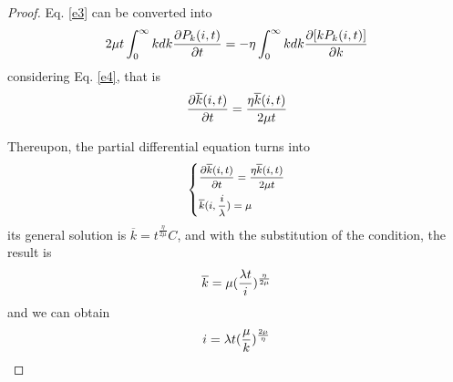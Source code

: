 \documentclass[final]{IEEEtran}
\begin{document}
\begin{proof}
Eq. \ref{e3} can be converted into
\begin{equation}\footnotesize
2\mu t \int_{0}^{\infty}kdk\frac{\partial P_{k}(i, t)}{\partial
t}=-\eta\int_{0}^{\infty}kdk\frac{\partial [kP_{k}(i,
t)]}{\partial k}
\end{equation}
considering Eq. \ref{e4}, that is
\begin{equation}\footnotesize
\frac{\partial \overline{k}(i,t)}{\partial
t}=\frac{\eta\overline{k}(i,t)}{2\mu t}
\end{equation}

Thereupon, the partial differential equation turns into
\begin{equation}\footnotesize
  \left\{
   \begin{aligned}
   &\frac{\partial \overline{k}(i,t)}{\partial
t}=\frac{\eta\overline{k}(i,t)}{2\mu t}\\
&\overline k(i,\frac{i}{\lambda})=\mu\\
   \end{aligned}
   \right.
  \end{equation}
its general solution is $\overline{k}=t^{\frac{\eta}{2\mu}}C$, and
with the substitution of the condition, the result is
\begin{equation}\footnotesize
\overline{k}=\mu(\frac{\lambda t}{i})^{\frac{\eta}{2\mu}}
\end{equation}
and we can obtain
\begin{equation}\label{eq26}\footnotesize
i=\lambda t(\frac{\mu}{k})^{\frac{2\mu}{\eta}}
\end{equation}


\end{proof}
\end{document}
